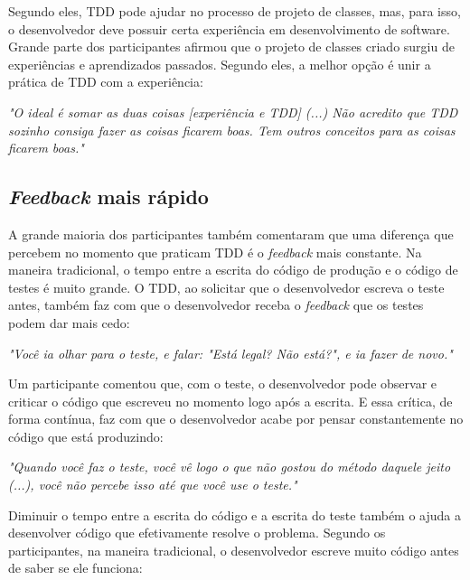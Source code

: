 \documentclass[conference]{IEEEtran}
\begin{document}
Segundo eles, TDD pode ajudar no processo de projeto de classes, mas, para isso,
o desenvolvedor deve possuir certa experiência em desenvolvimento de software. 
Grande parte dos participantes afirmou que o 
projeto de classes criado surgiu de experiências e aprendizados passados.
Segundo eles, a melhor opção é unir a prática de TDD com a experiência:

\begin{framed}
\textit{"O ideal é somar as duas coisas [experiência e TDD] (...) 
Não acredito que TDD sozinho consiga fazer as coisas ficarem boas. Tem outros conceitos
para as coisas ficarem boas."}
\end{framed}

\subsection{\textit{Feedback} mais rápido}

A grande maioria dos participantes também comentaram que uma diferença que percebem
no momento que praticam TDD é o \textit{feedback} mais constante. Na maneira
tradicional, o tempo entre a escrita do código de produção e o código
de testes é muito grande. O TDD, ao solicitar que o desenvolvedor
escreva o teste antes, também faz com que o desenvolvedor receba o \textit{feedback} que
os testes podem dar mais cedo:

\begin{framed}
\textit{"Você ia olhar para o teste, e falar: "Está legal? Não está?", e ia fazer de novo."}
\end{framed}

Um participante comentou que, com o teste, o desenvolvedor pode observar
e criticar o código que escreveu no momento logo após a escrita.
E essa crítica, de forma contínua, faz com que o desenvolvedor acabe
por pensar constantemente no código que está produzindo:

\begin{framed}
\textit{"Quando você faz o teste, você vê logo o que não gostou do método daquele jeito (...), você
não percebe isso até que você use o teste."}
\end{framed}

Diminuir o tempo entre a escrita do código e a escrita do teste também o ajuda a desenvolver código
que efetivamente resolve o problema. Segundo os participantes, na maneira tradicional, 
o desenvolvedor escreve muito código antes de saber se ele funciona:
\end{document}
